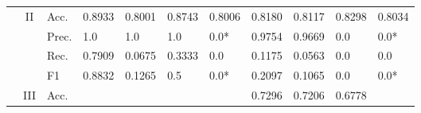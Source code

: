 \begin{tabular}{cclllllllll}
    \cmidrule{2-11}
                                                                                                               & \multirow{4}{*}{II}               & Acc.                                                 & 0.8933                  & 0.8001                  & 0.8743                       & 0.8006                  & 0.8180                                                                       & 0.8117                                                                      & 0.8298                                    & 0.8034                                    \\
                                                                                                               &                                   & Prec.                                                & 1.0                     & 1.0                     & 1.0                          & 0.0*                    & 0.9754                                                                       & 0.9669                                                                      & 0.0                                       & 0.0*                                      \\
                                                                                                               &                                   & Rec.                                                 & 0.7909                  & 0.0675                  & 0.3333                       & 0.0                     & 0.1175                                                                       & 0.0563                                                                      & 0.0                                       & 0.0                                       \\
                                                                                                               &                                   & F1                                                   & 0.8832                  & 0.1265                  & 0.5                          & 0.0*                    & 0.2097                                                                       & 0.1065                                                                      & 0.0                                       & 0.0*                                      \\ 
    \cmidrule{2-11}
                                                                                                               & \multirow{4}{*}{III}              & Acc.                                                 &                         &                         &                              &                         & 0.7296                                                                       & 0.7206                                                                      & 0.6778                                    &                                           \\

\end{tabular}
